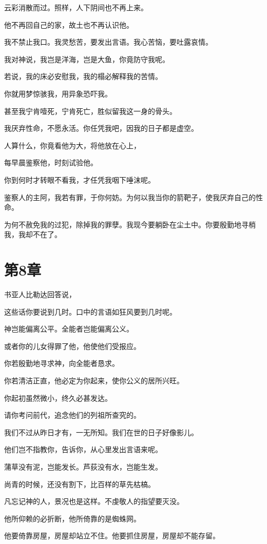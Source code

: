 \documentclass[12pt,oneside]{book}
\begin{document}
云彩消散而过。照样，人下阴间也不再上来。

他不再回自己的家，故土也不再认识他。

我不禁止我口。我灵愁苦，要发出言语。我心苦恼，要吐露哀情。

我对神说，我岂是洋海，岂是大鱼，你竟防守我呢。

若说，我的床必安慰我，我的榻必解释我的苦情。

你就用梦惊骇我，用异象恐吓我。

甚至我宁肯噎死，宁肯死亡，胜似留我这一身的骨头。

我厌弃性命，不愿永活。你任凭我吧，因我的日子都是虚空。

人算什么，你竟看他为大，将他放在心上，

每早晨鉴察他，时刻试验他。

你到何时才转眼不看我，才任凭我咽下唾沫呢。

鉴察人的主阿，我若有罪，于你何妨。为何以我当你的箭靶子，使我厌弃自己的性命。

为何不赦免我的过犯，除掉我的罪孽。我现今要躺卧在尘土中。你要殷勤地寻梢我，我却不在了。


\chapter{第8章}
书亚人比勒达回答说，

这些话你要说到几时。口中的言语如狂风要到几时呢。

神岂能偏离公平。全能者岂能偏离公义。

或者你的儿女得罪了他，他使他们受报应。

你若殷勤地寻求神，向全能者恳求。

你若清洁正直，他必定为你起来，使你公义的居所兴旺。

你起初虽然微小，终久必甚发达。

请你考问前代，追念他们的列祖所查究的。

我们不过从昨日才有，一无所知。我们在世的日子好像影儿。

他们岂不指教你，告诉你，从心里发出言语来呢。

蒲草没有泥，岂能发长。芦荻没有水，岂能生发。

尚青的时候，还没有割下，比百样的草先枯槁。

凡忘记神的人，景况也是这样。不虔敬人的指望要灭没。

他所仰赖的必折断，他所倚靠的是蜘蛛网。

他要倚靠房屋，房屋却站立不住。他要抓住房屋，房屋却不能存留。
\end{document}

